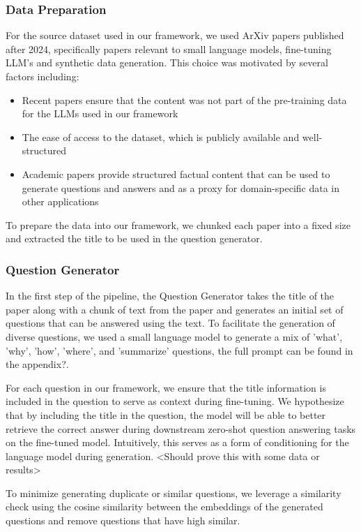 \subsubsection{Data Preparation}
For the source dataset used in our framework, we used ArXiv papers published after 2024, specifically papers relevant to 
small language models, fine-tuning LLM's and synthetic data generation.
This choice was motivated by several factors including:
\begin{itemize}
  \item Recent papers ensure that the content was not part of the pre-training data for the LLMs used in our framework
  \item The ease of access to the dataset, which is publicly available and well-structured
  \item Academic papers provide structured factual content that can be used to generate questions and answers and as a proxy for 
  domain-specific data in other applications
\end{itemize}

To prepare the data into our framework, we chunked each paper into a fixed size and extracted the title to be used in the 
question generator. 

\subsubsection{Question Generator}

In the first step of the pipeline, the Question Generator takes the title of the paper along with a chunk of text from the paper
and generates an initial set of questions that can be answered using the text. To facilitate the generation of diverse questions,
we used a small language model to generate a mix of 'what', 'why', 'how', 'where', and 'summarize' questions, the full prompt can be found in the appendix?.

For each question in our framework, we ensure that the title information is included in the question to serve as context during fine-tuning. We hypothesize 
that by including the title in the question, the model will be able to better retrieve the correct answer during downstream zero-shot question answering tasks on the fine-tuned
model. Intuitively, this serves as a form of conditioning for the language model during generation. <Should prove this with some data or results>

To minimize generating duplicate or similar questions, we leverage a similarity check using the cosine similarity between the embeddings of the generated questions
and remove questions that have high similar. 

